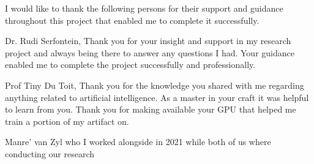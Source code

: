 \documentclass[a4paper,oneside,12pt]{book}
\begin{document}

\MakeTitle %


\begin{Acknowledgements}{}
			I would like to thank the following persons for their support and guidance throughout this project that enabled me to complete it successfully.
			
			Dr. Rudi Serfontein, Thank you for your insight and support in my research project and always being there to answer any questions I had. Your guidance enabled me to complete the project successfully and professionally. 
			
			Prof   Tiny Du Toit, Thank you for the knowledge you shared with me regarding anything related to artificial intelligence. As a master in your craft it was helpful to learn from you. Thank you for making available your GPU that helped me train a portion of my artifact on.
			
			Manre' van Zyl who I worked alongside in 2021 while both of us where conducting our research
\end{Acknowledgements}
\end{document}
